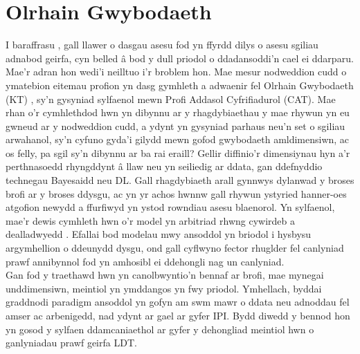 \section{Olrhain Gwybodaeth}
I baraffrasu \textcite{meara_complexities_1994}, gall llawer o dasgau asesu fod yn ffyrdd dilys o asesu sgiliau adnabod geirfa, cyn belled â bod y dull priodol o ddadansoddi'n cael ei ddarparu. Mae'r adran hon wedi'i neilltuo i'r broblem hon. Mae mesur nodweddion cudd o ymatebion eitemau profion yn dasg gymhleth a adwaenir fel Olrhain Gwybodaeth (KT) \parencite{shen_survey_2024}, sy'n gysyniad sylfaenol mewn Profi Addasol Cyfrifiadurol (CAT). Mae rhan o'r cymhlethdod hwn yn dibynnu ar y rhagdybiaethau y mae rhywun yn eu gwneud ar y nodweddion cudd, a ydynt yn gysyniad parhaus neu'n set o sgiliau arwahanol, sy'n cyfuno gyda'i gilydd mewn gofod gwybodaeth amldimensiwn, ac os felly, pa sgil sy'n dibynnu ar ba rai eraill? Gellir diffinio'r dimensiynau hyn a'r perthnasoedd rhyngddynt â llaw neu yn seiliedig ar ddata, gan ddefnyddio technegau Bayesaidd neu DL. Gall rhagdybiaeth arall gynnwys dylanwad y broses brofi ar y broses ddysgu, ac yn yr achos hwnnw gall rhywun ystyried hanner-oes atgofion newydd a ffurfiwyd yn ystod rowndiau asesu blaenorol. Yn sylfaenol, mae'r dewis cymhleth hwn o'r model yn arbitriad rhwng cywirdeb a dealladwyedd \parencite{pelanek_adaptive_2025}. Efallai bod modelau mwy ansoddol yn briodol i hysbysu argymhellion o ddeunydd dysgu, ond gall cyflwyno fector rhuglder fel canlyniad prawf annibynnol fod yn amhosibl ei ddehongli nag un canlyniad.\\
Gan fod y traethawd hwn yn canolbwyntio'n bennaf ar brofi, mae mynegai unddimensiwn, meintiol yn ymddangos yn fwy priodol. Ymhellach, byddai graddnodi paradigm ansoddol yn gofyn am swm mawr o ddata neu adnoddau fel amser ac arbenigedd, nad ydynt ar gael ar gyfer IPI. Bydd diwedd y bennod hon yn gosod y sylfaen ddamcaniaethol ar gyfer y dehongliad meintiol hwn o ganlyniadau prawf geirfa LDT.

